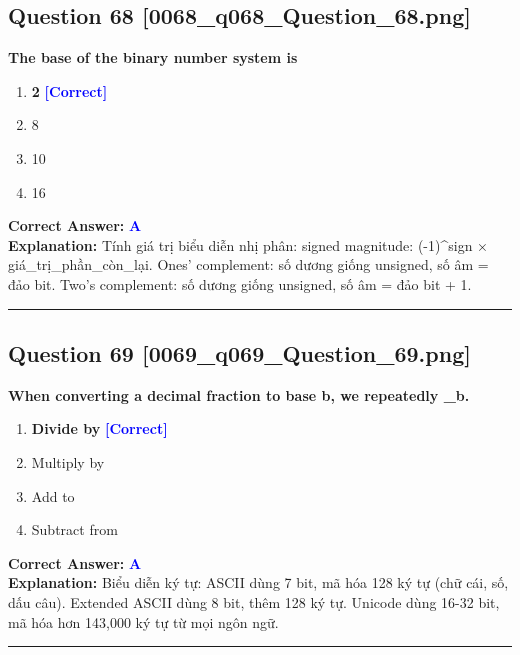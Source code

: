 \documentclass[11pt,a4paper]{article}
\begin{document}
\begin{minipage}{\textwidth}
\subsection*{Question 68 \quad \footnotesize{[0068\_q068\_Question\_68.png]}}
\noindent \textbf{The base of the binary number system is}

\begin{enumerate}[label=\Alph*.]
    \item \textbf{2} \hfill \textcolor{blue}{\textbf{[Correct]}}
    \item 8
    \item 10
    \item 16
\end{enumerate}

\noindent \textbf{Correct Answer:} \textcolor{blue}{\textbf{A}} \\[2pt]
\noindent \textbf{Explanation:} Tính giá trị biểu diễn nhị phân: signed magnitude: (-1)\textasciicircum{}sign × giá\_trị\_phần\_còn\_lại. Ones' complement: số dương giống unsigned, số âm = đảo bit. Two's complement: số dương giống unsigned, số âm = đảo bit + 1.

\par\vspace{0.3cm}
\hrule
\vspace{0.3cm}
\end{minipage}

\begin{minipage}{\textwidth}
\subsection*{Question 69 \quad \footnotesize{[0069\_q069\_Question\_69.png]}}
\noindent \textbf{When converting a decimal fraction to base b, we repeatedly \_b.}

\begin{enumerate}[label=\Alph*.]
    \item \textbf{Divide by} \hfill \textcolor{blue}{\textbf{[Correct]}}
    \item Multiply by
    \item Add to
    \item Subtract from
\end{enumerate}

\noindent \textbf{Correct Answer:} \textcolor{blue}{\textbf{A}} \\[2pt]
\noindent \textbf{Explanation:} Biểu diễn ký tự: ASCII dùng 7 bit, mã hóa 128 ký tự (chữ cái, số, dấu câu). Extended ASCII dùng 8 bit, thêm 128 ký tự. Unicode dùng 16-32 bit, mã hóa hơn 143,000 ký tự từ mọi ngôn ngữ.

\par\vspace{0.3cm}
\hrule
\vspace{0.3cm}
\end{minipage}
\end{document}
